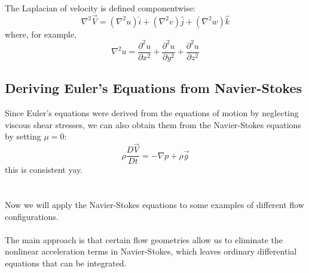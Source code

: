 ﻿\documentclass[12pt]{article}
\begin{document}
\begin{notebox}
The Laplacian of velocity is defined componentwise:
\[
\nabla^2\vec V=(\nabla^2u)\hat i+(\nabla^2v)\hat j+(\nabla^2w)\hat k
\]
where, for example,
\[
\nabla^2u=\frac{\partial^2u}{\partial x^2}+\frac{\partial^2u}{\partial y^2}+\frac{\partial^2u}{\partial z^2}
\]
\end{notebox}
\subsection*{Deriving Euler's Equations from Navier-Stokes}
Since Euler's equations were derived from the equations of motion by neglecting viscous shear stresses, we can also obtain them from the Navier-Stokes equations by setting \(\mu=0\):
\[
\rho\frac{D\vec V}{Dt}=-\nabla p+\rho\vec g
\]
this is consistent yay.
\section*{}
Now we will apply the Navier-Stokes equations to some examples of different flow configurations.\\\\
The main approach is that certain flow geometries allow us to eliminate the nonlinear acceleration terms in Navier-Stokes, which leaves ordinary differential equations that can be integrated.
\end{document}
